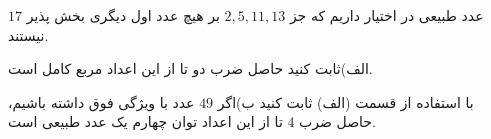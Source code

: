 \EXERCISE
$17$
عدد طبیعی در اختیار داریم که جز
$2, 5, 11, 13$
بر هیچ عدد اول دیگری بخش پذیر نیستند.

الف)ثابت کنید حاصل ضرب دو تا از این اعداد مربع کامل است.

ب)اگر
$49$
عدد با ویژگی فوق داشته باشیم‫‪،‬‬ با استفاده از قسمت (الف) ثابت کنید حاصل ضرب
$4$
تا از این اعداد توان چهارم یک عدد طبیعی است.